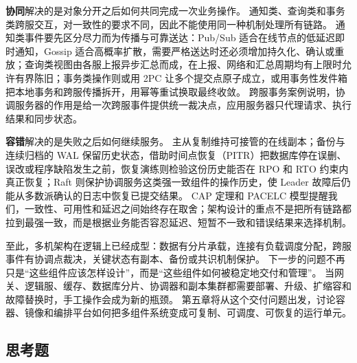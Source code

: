 \textbf{协同}解决的是对象分开之后如何共同完成一次业务操作。
通知类、查询类和事务类跨服交互，对一致性的要求不同，因此不能使用同一种机制处理所有链路。
通知类事件要先区分尽力而为传播与可靠送达：Pub/Sub 适合在线节点的低延迟即时通知，Gossip 适合高概率扩散，需要严格送达时还必须增加持久化、确认或重放；查询类视图由各服上报异步汇总而成，在上报、网络和汇总周期均有上限时允许有界陈旧；事务类操作则或用 2PC 让多个提交点原子成立，或用事务性发件箱把本地事务和跨服传播拆开，用幂等重试换取最终收敛。
跨服事务案例说明，协调服务器的作用是给一次跨服事件提供统一裁决点，应用服务器只代理请求、执行结果和同步状态。

\textbf{容错}解决的是失败之后如何继续服务。
主从复制维持可接管的在线副本；备份与连续归档的 WAL 保留历史状态，借助时间点恢复（PITR）把数据库停在误删、误改或程序缺陷发生之前，恢复演练则检验这份历史能否在 RPO 和 RTO 约束内真正恢复；Raft 则保护协调服务这类强一致组件的操作历史，使 Leader 故障后仍能从多数派确认的日志中恢复已提交结果。
CAP 定理和 PACELC 模型提醒我们，一致性、可用性和延迟之间始终存在取舍；架构设计的重点不是把所有链路都拉到最强一致，而是根据业务能否容忍延迟、短暂不一致和错误结果来选择机制。

至此，多机架构在逻辑上已经成型：数据有分片承载，连接有负载调度分配，跨服事件有协调点裁决，关键状态有副本、备份或共识机制保护。
下一步的问题不再只是“这些组件应该怎样设计”，而是“这些组件如何被稳定地交付和管理”。
当网关、逻辑服、缓存、数据库分片、协调器和副本集群都需要部署、升级、扩缩容和故障替换时，手工操作会成为新的瓶颈。
第五章将从这个交付问题出发，讨论容器、镜像和编排平台如何把多组件系统变成可复制、可调度、可恢复的运行单元。


\subsection{思考题}

